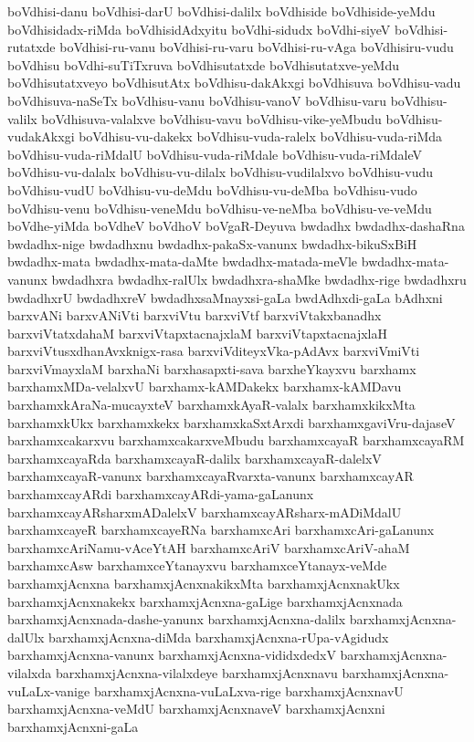 {boVdhisi-danu
boVdhisi-darU
boVdhisi-dalilx
boVdhiside
boVdhiside-yeMdu
boVdhisidadx-riMda
boVdhisidAdxyitu
boVdhi-sidudx
boVdhi-siyeV
boVdhisi-rutatxde
boVdhisi-ru-vanu
boVdhisi-ru-varu
boVdhisi-ru-vAga
boVdhisiru-vudu
boVdhisu
boVdhi-suTiTxruva
boVdhisutatxde
boVdhisutatxve-yeMdu
boVdhisutatxveyo
boVdhisutAtx
boVdhisu-dakAkxgi
boVdhisuva
boVdhisu-vadu
boVdhisuva-naSeTx
boVdhisu-vanu
boVdhisu-vanoV
boVdhisu-varu
boVdhisu-valilx
boVdhisuva-valalxve
boVdhisu-vavu
boVdhisu-vike-yeMbudu
boVdhisu-vudakAkxgi
boVdhisu-vu-dakekx
boVdhisu-vuda-ralelx
boVdhisu-vuda-riMda
boVdhisu-vuda-riMdalU
boVdhisu-vuda-riMdale
boVdhisu-vuda-riMdaleV
boVdhisu-vu-dalalx
boVdhisu-vu-dilalx
boVdhisu-vudilalxvo
boVdhisu-vudu
boVdhisu-vudU
boVdhisu-vu-deMdu
boVdhisu-vu-deMba
boVdhisu-vudo
boVdhisu-venu
boVdhisu-veneMdu
boVdhisu-ve-neMba
boVdhisu-ve-veMdu
boVdhe-yiMda
boVdheV
boVdhoV
boVgaR-Deyuva
bwdadhx
bwdadhx-dashaRna
bwdadhx-nige
bwdadhxnu
bwdadhx-pakaSx-vanunx
bwdadhx-bikuSxBiH
bwdadhx-mata
bwdadhx-mata-daMte
bwdadhx-matada-meVle
bwdadhx-mata-vanunx
bwdadhxra
bwdadhx-ralUlx
bwdadhxra-shaMke
bwdadhx-rige
bwdadhxru
bwdadhxrU
bwdadhxreV
bwdadhxsaMnayxsi-gaLa
bwdAdhxdi-gaLa
bAdhxni
barxvANi
barxvANiVti
barxviVtu
barxviVtf
barxviVtakxbanadhx
barxviVtatxdahaM
barxviVtapxtacnajxlaM
barxviVtapxtacnajxlaH
barxviVtusxdhanAvxknigx-rasa
barxviVditeyxVka-pAdAvx
barxviVmiVti
barxviVmayxlaM
barxhaNi
barxhasapxti-sava
barxheYkayxvu
barxhamx
barxhamxMDa-velalxvU
barxhamx-kAMDakekx
barxhamx-kAMDavu
barxhamxkAraNa-mucayxteV
barxhamxkAyaR-valalx
barxhamxkikxMta
barxhamxkUkx
barxhamxkekx
barxhamxkaSxtArxdi
barxhamxgaviVru-dajaseV
barxhamxcakarxvu
barxhamxcakarxveMbudu
barxhamxcayaR
barxhamxcayaRM
barxhamxcayaRda
barxhamxcayaR-dalilx
barxhamxcayaR-dalelxV
barxhamxcayaR-vanunx
barxhamxcayaRvarxta-vanunx
barxhamxcayAR
barxhamxcayARdi
barxhamxcayARdi-yama-gaLanunx
barxhamxcayARsharxmADalelxV
barxhamxcayARsharx-mADiMdalU
barxhamxcayeR
barxhamxcayeRNa
barxhamxcAri
barxhamxcAri-gaLanunx
barxhamxcAriNamu-vAceYtAH
barxhamxcAriV
barxhamxcAriV-ahaM
barxhamxcAsw
barxhamxceYtanayxvu
barxhamxceYtanayx-veMde
barxhamxjAcnxna
barxhamxjAcnxnakikxMta
barxhamxjAcnxnakUkx
barxhamxjAcnxnakekx
barxhamxjAcnxna-gaLige
barxhamxjAcnxnada
barxhamxjAcnxnada-dashe-yanunx
barxhamxjAcnxna-dalilx
barxhamxjAcnxna-dalUlx
barxhamxjAcnxna-diMda
barxhamxjAcnxna-rUpa-vAgidudx
barxhamxjAcnxna-vanunx
barxhamxjAcnxna-vididxdedxV
barxhamxjAcnxna-vilalxda
barxhamxjAcnxna-vilalxdeye
barxhamxjAcnxnavu
barxhamxjAcnxna-vuLaLx-vanige
barxhamxjAcnxna-vuLaLxva-rige
barxhamxjAcnxnavU
barxhamxjAcnxna-veMdU
barxhamxjAcnxnaveV
barxhamxjAcnxni
barxhamxjAcnxni-gaLa
}
